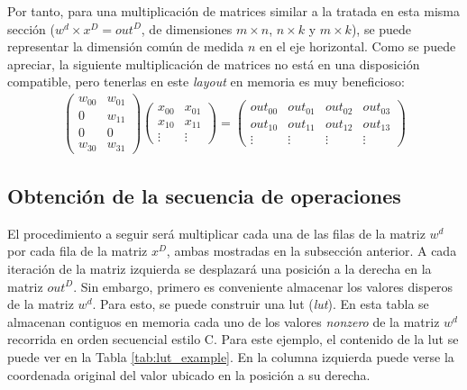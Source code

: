Por tanto, para una multiplicación de matrices similar a la tratada en esta misma sección ($w^{d} \times x^{D} = out^{D}$, de dimensiones $m \times n$, $n \times k$ y $m \times k$), se puede representar la dimensión común de medida $n$ en el eje horizontal. Como se puede apreciar, la siguiente multiplicación de matrices no está en una disposición compatible, pero tenerlas en este \textit{layout} en memoria es muy beneficioso: 
\begin{gather}
    \begin{pmatrix}
        w_{00} & w_{01}\\
        0 & w_{11}\\
        0 & 0\\
        w_{30} & w_{31}
    \end{pmatrix}	
    \begin{pmatrix}
        x_{00} & x_{01}\\
        x_{10} & x_{11}\\
        \vdots & \vdots
    \end{pmatrix}
    =
    \begin{pmatrix}
        out_{00} & out_{01} & out_{02} & out_{03}\\
        out_{10} & out_{11} & out_{12} & out_{13}\\
        \vdots & \vdots & \vdots & \vdots
    \end{pmatrix} \nonumber
\end{gather}

\subsection{Obtención de la secuencia de operaciones}
\label{ssec:obtencion_secuencia_operaciones}
El procedimiento a seguir será multiplicar cada una de las filas de la matriz $w^{d}$ por cada fila de la matriz $x^{D}$, ambas mostradas en la subsección anterior. A cada iteración de la matriz izquierda se desplazará una posición a la derecha en la matriz $out^{D}$. Sin embargo, primero es conveniente almacenar los valores disperos de la matriz $w^{d}$. Para esto, se puede construir una \acrshort{lut} (\textit{\acrlong{lut}}). En esta tabla se almacenan contiguos en memoria cada uno de los valores \textit{nonzero} de la matriz $w^{d}$ recorrida en orden secuencial estilo C. Para este ejemplo, el contenido de la \acrshort{lut} se puede ver en la Tabla \ref{tab:lut_example}. En la columna izquierda puede verse la coordenada original del valor ubicado en la posición a su derecha.

